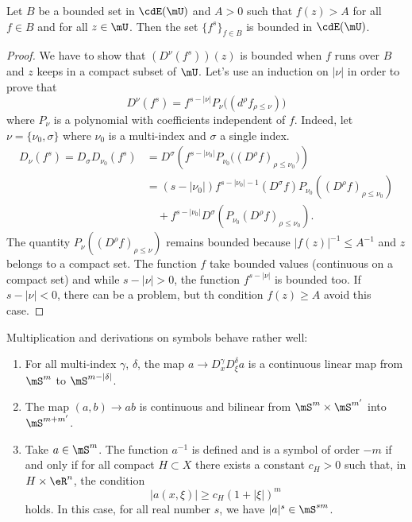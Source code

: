 \begin{lemma}   \label{LemHIUsKABh}
	Let $B$ be a bounded set in $\cdE(\mU)$ and $A>0$ such that $f(z)>A$ for all $f\in B$ and for all $z\in\mU$. Then the set $\{f^s\}_{f\in B}$ is bounded in $\cdE(\mU)$.
\end{lemma}

\begin{proof}
	We have to show that $(D^{\nu}(f^s))(z)$ is bounded when $f$ runs over $B$ and $z$ keeps in a compact subset of $\mU$. Let's use an induction on $|\nu|$ in order to prove that
	\[
		D^{\nu}(f^s)=f^{s-|\nu|}P_{\nu}\big(  (d^{\rho}f_{\rho\leq\nu})   \big)
	\]
	where $P_{\nu}$ is a polynomial with coefficients independent of $f$. Indeed, let $\nu=\{\nu_0,\sigma\}$ where $\nu_0$ is a multi-index and $\sigma$ a single index.
	\begin{equation}
		\begin{split}
			D_{\nu}(f^s)=D_{\sigma}D_{\nu_0}(f^s)&=D^{\sigma}\left( f^{s-|\nu_0|}P_{\nu_0}\big( (D^{\rho}f)_{\rho\leq\nu_0} \big) \right)\\
			&=(s-|\nu_0|)f^{s-|\nu_0|-1}(D^{\sigma}f)P_{\nu_0}\left( (D^{\rho}f)_{\rho\leq\nu_0} \right)\\
			&\quad    +f^{s-|\nu_0|}D^{\sigma}\left( P_{\nu_0}(D^{\rho}f)_{\rho\leq\nu_0} \right).
		\end{split}
	\end{equation}
	The quantity $P_{\nu}\left( (D^{\rho}f)_{\rho\leq\nu} \right)$ remains bounded because $|f(z)|^{-1}\leq A^{-1}$ and $z$ belongs to a compact set. The function $f$ take bounded values (continuous on a compact set) and while $s-|\nu|>0$, the function $f^{s-|\nu|}$ is bounded too. If $s-|\nu|<0$, there can be a problem, but th condition $f(z)\geq A$ avoid this case.
\end{proof}

\begin{theorem} \label{tho:lenumf}
	Multiplication and derivations on symbols behave rather well:
	\begin{enumerate}
		\item \label{enufi}  For all multi-index $\gamma$, $\delta$, the map $a\to D^{\gamma}_xD^{\delta}_{\xi}a$ is a continuous linear map from $\mS^m$ to $\mS^{m-|\delta|}$.
		\item \label{enufii} The map  $(a,b)\to ab$ is continuous and bilinear from $\mS^{m}\times\mS^{m'}$ into $\mS^{m+m'}$.
		\item \label{enufiii} Take $a\in\mS^m$. The function $a^{-1}$ is defined and is a symbol of order $-m$ if and only if for all compact $H\subset X$ there exists a constant $c_H>0$ such that, in $H\times\eR^n$, the condition
		      \[
			      |a(x,\xi)|\geq c_H(1+|\xi|)^m
		      \]
		      holds. In this case, for all real number $s$, we have $|a|^s\in\mS^{sm}$.
	\end{enumerate}
\end{theorem}

